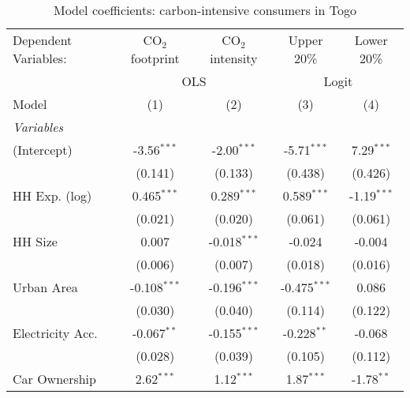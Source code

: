 
\begin{table}[htbp!]
   \centering
   \small
   \begin{adjustbox}{width = 1\textwidth, max height = 0.95\textheight, center}
      \begin{threeparttable}[b]
         \caption{\label{tab:Logit_1_TGO} Model coefficients: carbon-intensive consumers in Togo}
         \begin{tabular}{lcccc}
            \tabularnewline \midrule \midrule
            Dependent Variables: & CO$_{2}$ footprint & CO$_{2}$ intensity & Upper 20\%     & Lower 20\%\\   
             & \multicolumn{2}{c}{OLS} & \multicolumn{2}{c}{Logit} \\ 
            Model                & (1)                & (2)                & (3)            & (4)\\  
            \midrule
            \emph{Variables}\\
            (Intercept)          & -3.56$^{***}$      & -2.00$^{***}$      & -5.71$^{***}$  & 7.29$^{***}$\\   
                                 & (0.141)            & (0.133)            & (0.438)        & (0.426)\\   
            HH Exp. (log)        & 0.465$^{***}$      & 0.289$^{***}$      & 0.589$^{***}$  & -1.19$^{***}$\\   
                                 & (0.021)            & (0.020)            & (0.061)        & (0.061)\\   
            HH Size              & 0.007              & -0.018$^{***}$     & -0.024         & -0.004\\   
                                 & (0.006)            & (0.007)            & (0.018)        & (0.016)\\   
            Urban Area           & -0.108$^{***}$     & -0.196$^{***}$     & -0.475$^{***}$ & 0.086\\   
                                 & (0.030)            & (0.040)            & (0.114)        & (0.122)\\   
            Electricity Acc.     & -0.067$^{**}$      & -0.155$^{***}$     & -0.228$^{**}$  & -0.068\\   
                                 & (0.028)            & (0.039)            & (0.105)        & (0.112)\\   
            Car Ownership        & 2.62$^{***}$       & 1.12$^{***}$       & 1.87$^{***}$   & -1.78$^{**}$\\   

\end{tabular}
\end{threeparttable}
\end{adjustbox}
\end{table}
